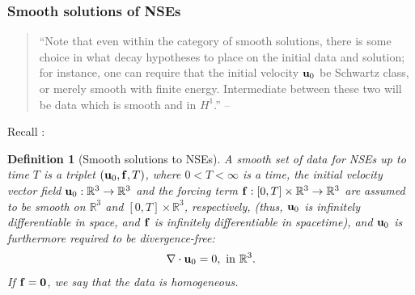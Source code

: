\documentclass{article}
\numberwithin{equation}{section}
\newtheorem{definition}{Definition}[section]
\begin{document}
\subsubsection{Smooth solutions of NSEs}
\begin{quotation}
	``Note that even within the category of smooth solutions, there is some choice in what decay hypotheses to place on the initial data and solution; for instance, one can require that the initial velocity ${\bf u}_0$ be Schwartz class, or merely smooth with finite energy. Intermediate between these two will be data which is smooth and in $H^1$.'' -- \cite{Tao2013}
\end{quotation}
Recall \cite[Def. 1.1]{Tao2013}:
\begin{definition}[Smooth solutions to NSEs]
	A \emph{smooth set of data} for NSEs up to time $T$ is a triplet $({\bf u}_0,{\bf f},T)$, where $0 < T < \infty$ is a time, the initial velocity vector field ${\bf u}_0:\mathbb{R}^3\to\mathbb{R}^3$ and the forcing term ${\bf f}:[0,T]\times\mathbb{R}^3\to\mathbb{R}^3$ are assumed to be smooth on $\mathbb{R}^3$ and $[0,T]\times\mathbb{R}^3$, respectively, (thus, ${\bf u}_0$ is infinitely differentiable in space, and ${\bf f}$ is infinitely differentiable in spacetime), and ${\bf u}_0$ is furthermore required to be divergence-free:
	\begin{align}
		\label{divergence-free initial velocity}
		\nabla\cdot{\bf u}_0 = 0,\mbox{ in }\mathbb{R}^3.
	\end{align}
	If ${\bf f} = {\bf 0}$, we say that the data is \emph{homogeneous}.
	

\end{definition}
\end{document}
